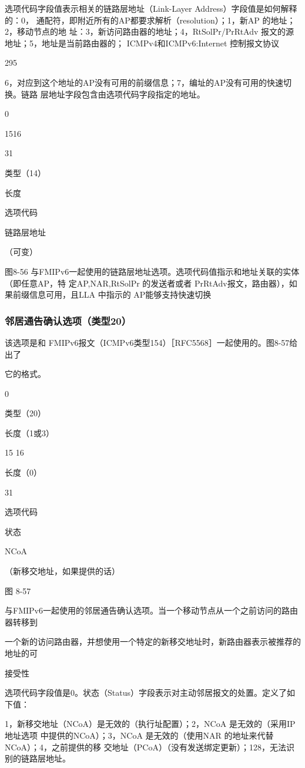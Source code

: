 选项代码字段值表示相关的链路层地址（Link-Layer Address）字段值是如何解释的：0，
通配符，即附近所有的AP都要求解析（resolution）；1，新AP 的地址；2，移动节点的地
址：3，新访问路由器的地址；4，RtSolPr/PrRtAdv 报文的源地址；5，地址是当前路由器的；
ICMPv4和ICMPv6:Internet 控制报文协议

295

6，对应到这个地址的AP没有可用的前缀信息；7，编址的AP没有可用的快速切换。链路
层地址字段包含由选项代码字段指定的地址。

0

1516

31

类型（14）

长度

选项代码

链路层地址

（可变）

图8-56 与FMIPv6一起使用的链路层地址选项。选项代码值指示和地址关联的实体（即任意AP，特
定AP,NAR,RtSolPr 的发送者或者 PrRtAdv报文，路由器），如果前缀信息可用，且LLA
中指示的 AP能够支持快速切换

\subsubsection{邻居通告确认选项（类型20）}
该选项是和 FMIPv6报文（ICMPv6类型154）［RFC5568］一起使用的。图8-57给出了

它的格式。

0

类型（20）

长度（1或3）

15 16

长度（0）

31

选项代码

状态

NCoA

（新移交地址，如果提供的话）

图 8-57

与FMIPv6一起使用的邻居通告确认选项。当一个移动节点从一个之前访问的路由器转移到

一个新的访问路由器，并想使用一个特定的新移交地址时，新路由器表示被推荐的地址的可

接受性

选项代码字段值是0。状态（Status）字段表示对主动邻居报文的处置。定义了如下值：

1，新移交地址（NCoA）是无效的（执行址配置）；2，NCoA 是无效的（采用IP地址选项
中提供的NCoA）；3，NCoA 是无效的（使用NAR 的地址来代替NCoA）；4，之前提供的移
交地址（PCoA）（没有发送绑定更新）；128，无法识别的链路层地址。

